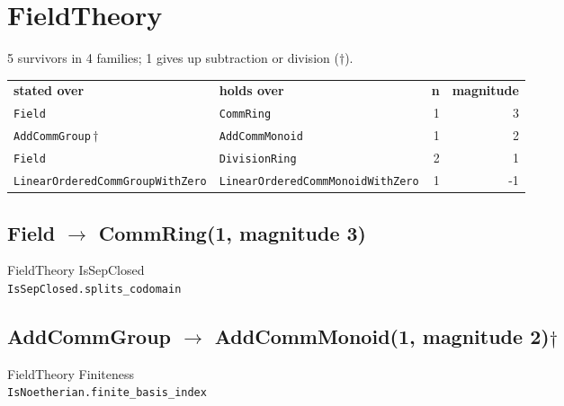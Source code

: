 \documentclass[10pt,a4paper]{article}
\begin{document}
\bigskip
\section{FieldTheory}
5 survivors in 4 families; 1 gives up subtraction or division ($\dagger$).

\begin{center}
\begin{tabular}{llrr}
\textbf{stated over} & \textbf{holds over} & \textbf{n} & \textbf{magnitude}\\[2pt]
\texttt{\small Field} & \texttt{\small CommRing} & 1 & 3\\
\texttt{\small AddCommGroup}\,$\dagger$ & \texttt{\small AddCommMonoid} & 1 & 2\\
\texttt{\small Field} & \texttt{\small DivisionRing} & 2 & 1\\
\texttt{\small LinearOrderedCommGroupWithZero} & \texttt{\small LinearOrderedCommMonoidWithZero} & 1 & -1\\
\end{tabular}
\end{center}

\subsection*{Field $\to$ CommRing\quad\textmd{\small (1, magnitude 3)}}
{\footnotesize\color{locator}FieldTheory\,\textperiodcentered\,IsSepClosed}\\
\hspace*{1em}\texttt{\small IsSepClosed.\allowbreak{}splits\_codomain}\\

\subsection*{AddCommGroup $\to$ AddCommMonoid\quad\textmd{\small (1, magnitude 2)\;$\dagger$}}
{\footnotesize\color{locator}FieldTheory\,\textperiodcentered\,Finiteness}\\
\hspace*{1em}\texttt{\small IsNoetherian.\allowbreak{}finite\_basis\_index}\;{\footnotesize$\ddagger$}\\
\end{document}
